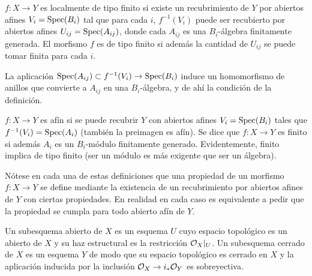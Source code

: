 \documentclass[GA.tex]{subfiles}
\begin{document}
\begin{defi}
$f:X\to Y$ es localmente de tipo finito si existe un recubrimiento de $Y$ por abiertos afines $V_i=\operatorname{Spec}(B_i)$ tal que para cada $i$, $f^{-1}(V_i)$ puede ser recubierto por abiertos afines $U_{ij}=\operatorname{Spec}(A_{ij})$, donde cada $A_{ij}$ es una $B_i$-álgebra finitamente generada. El morfismo $f$ es de tipo finito si además la cantidad de $U_{ij}$ se puede tomar finita para cada $i$. 
\end{defi}

\begin{observacion}
La aplicación $\operatorname{Spec}(A_{ij})\subset f^{-1}(V_i)\to \operatorname{Spec}(B_i)$ induce un homomorfismo de anillos que convierte a $A_{ij}$ en una $B_i$-álgebra, y de ahí la condición de la definición. 
\end{observacion}

\begin{defi}
$f:X\to Y$ es afín si se puede recubrir $Y$ con abiertos afines $V_i=\operatorname{Spec}(B_i)$ tales que $f^{-1}(V_i)=\operatorname{Spec}(A_i)$ (también la preimagen es afín). Se dice que $f:X\to Y$ es finito si además $A_i$ es un $B_i$-módulo finitamente generado. Evidentemente, finito implica de tipo finito (ser un módulo es más exigente que ser un álgebra).
\end{defi}

Nótese en cada una de estas definiciones que una propiedad de un morfismo $f:X\to Y$ se define mediante la existencia de un recubrimiento por abiertos afines de $Y$ con ciertas propiedades. En realidad en cada caso es equivalente a pedir que la propiedad se cumpla para todo abierto afín de $Y$. 


\begin{defi}
Un subesquema abierto de $X$ es un esquema $U$ cuyo espacio topológico es un abierto de $X$ y su haz estructural es la restricción ${\mathcal O}_{X}|_{U}$. Un subesquema cerrado de $X$ es un esquema $Y$ de modo que su espacio topológico es cerrado en $X$ y la aplicación inducida por la inclusión ${\mathcal O}_X\to i_*{\mathcal O}_Y$ es sobreyectiva.
\end{defi}
\end{document}
